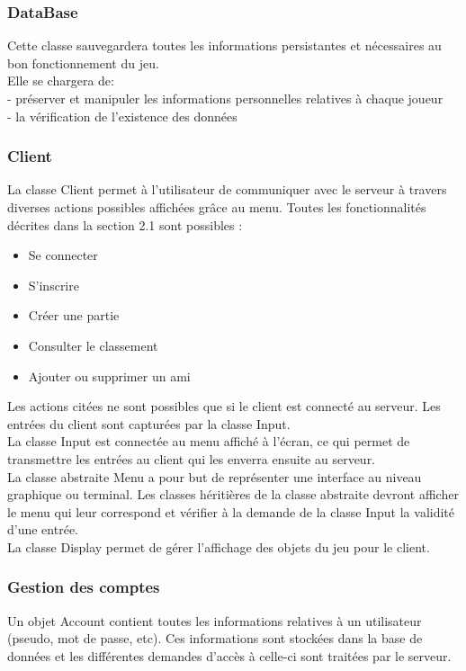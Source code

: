 \documentclass[a4paper,12pt]{article}
\begin{document}
\subsubsection{DataBase}
Cette classe sauvegardera toutes les informations persistantes et nécessaires au bon fonctionnement du jeu.\\
Elle se chargera de:\\
- préserver et manipuler les informations personnelles relatives à chaque joueur\\
- la vérification de l'existence des données

\subsubsection{Client}
La classe Client permet à l'utilisateur de communiquer avec le serveur à travers diverses actions possibles affichées grâce au menu.
Toutes les fonctionnalités décrites dans la section 2.1 sont possibles :
\begin{itemize}
    \item Se connecter
    \item S'inscrire
    \item Créer une partie
    \item Consulter le classement
    \item Ajouter ou supprimer un ami
\end{itemize}

Les actions citées ne sont possibles que si le client est connecté au serveur. Les entrées du client sont capturées par la classe Input.\\
La classe Input est connectée au menu affiché à l'écran, ce qui permet de transmettre les entrées au client qui les enverra ensuite au serveur.\\
La classe abstraite Menu a pour but de représenter une interface au niveau graphique ou terminal. Les classes héritières de la classe abstraite devront afficher le menu qui leur correspond et vérifier à la demande de la classe Input la validité d'une entrée.\\
La classe Display permet de gérer l'affichage des objets du jeu pour le client.


\subsubsection{Gestion des comptes}
Un objet Account contient toutes les informations relatives à un utilisateur (pseudo, mot de passe, etc). Ces informations sont stockées dans la base de données et les différentes demandes d'accès à celle-ci sont traitées par le serveur.
\end{document}
